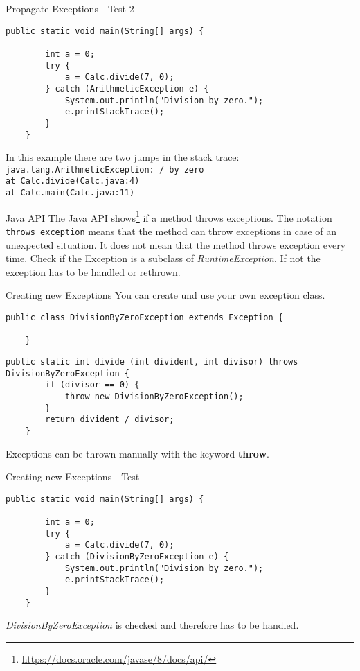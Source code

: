 \begin{frame}[fragile]{Propagate Exceptions - Test 2}
	\begin{lstlisting}[basicstyle=\ttfamily\scriptsize, firstnumber=7]
	public static void main(String[] args) {
	
	    int a = 0;
	    try {
	        a = Calc.divide(7, 0);
	    } catch (ArithmeticException e) {
	        System.out.println("Division by zero.");
	        e.printStackTrace();
	    }
	}
	\end{lstlisting}
	In this example there are two jumps in the stack trace:\\
	\texttt{java.lang.ArithmeticException: / by zero}\\
	\texttt{at Calc.divide(Calc.java:4)}\\
	\texttt{at Calc.main(Calc.java:11)}
\end{frame}

\begin{frame}{Java API}
	The Java API shows\footnote{\scriptsize\url{https://docs.oracle.com/javase/8/docs/api/}}
	if a method throws exceptions. 
	The notation \texttt{throws exception} means that the method can throw 
	exceptions in case of an unexpected situation.
	It does not mean that the method throws exception every time.
	\vfill
	Check if the Exception is a subclass of \emph{RuntimeException}. 
	If not the exception has to be handled or rethrown.
\end{frame}

\begin{frame}[fragile]{Creating new Exceptions}
	You can create und use your own exception class.
	\begin{lstlisting}[basicstyle=\ttfamily\scriptsize]
	public class DivisionByZeroException extends Exception {

	}
	\end{lstlisting}
	\vfill
	\begin{lstlisting}[basicstyle=\ttfamily\scriptsize]
	public static int divide (int divident, int divisor) throws DivisionByZeroException {
	    if (divisor == 0) {
	        throw new DivisionByZeroException();
	    }
	    return divident / divisor;
	}
	\end{lstlisting}	
	Exceptions can be thrown manually with the keyword \textbf{throw}.
\end{frame}

\begin{frame}[fragile]{Creating new Exceptions - Test}
	\begin{lstlisting}[basicstyle=\ttfamily\scriptsize]
	public static void main(String[] args) {
	
	    int a = 0;
	    try {
	        a = Calc.divide(7, 0);
	    } catch (DivisionByZeroException e) {
	        System.out.println("Division by zero.");
	        e.printStackTrace();
	    }
	}
	\end{lstlisting}	
	\emph{DivisionByZeroException} is checked and therefore has to be handled.
\end{frame}

